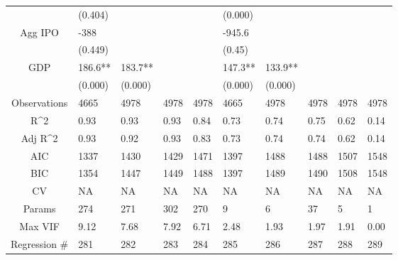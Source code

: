 \documentclass{article}
\begin{document}
\begin{table}[H]
\begin{tabular}{|clllllllll|}
   & (0.404) &  &  &  & (0.000) &  &  &  &  \\
  Agg IPO & -388 &  &  &  & -945.6 &  &  &  &  \\
   & (0.449) &  &  &  & (0.45) &  &  &  &  \\
  GDP & 186.6** & 183.7** &  &  & 147.3** & 133.9** &  &  &  \\
   & (0.000) & (0.000) &  &  & (0.000) & (0.000) &  &  &  \\
  \hline
 Observations & 4665 & 4978 & 4978 & 4978 & 4665 & 4978 & 4978 & 4978 & 4978 \\
  R^2 & 0.93 & 0.93 & 0.93 & 0.84 & 0.73 & 0.74 & 0.75 & 0.62 & 0.14 \\
  Adj R^2 & 0.93 & 0.92 & 0.93 & 0.83 & 0.73 & 0.74 & 0.74 & 0.62 & 0.14 \\
  AIC & 1337 & 1430 & 1429 & 1471 & 1397 & 1488 & 1488 & 1507 & 1548 \\
  BIC & 1354 & 1447 & 1449 & 1488 & 1397 & 1489 & 1490 & 1508 & 1548 \\
  CV & NA & NA & NA & NA & NA & NA & NA & NA & NA \\
  Params & 274 & 271 & 302 & 270 & 9 & 6 & 37 & 5 & 1 \\
  Max VIF & 9.12 & 7.68 & 7.92 & 6.71 & 2.48 & 1.93 & 1.97 & 1.91 & 0.00 \\
  Regression \# & 281 & 282 & 283 & 284 & 285 & 286 & 287 & 288 & 289 \\
   \hline
\end{tabular}

\end{table}
\end{document}

